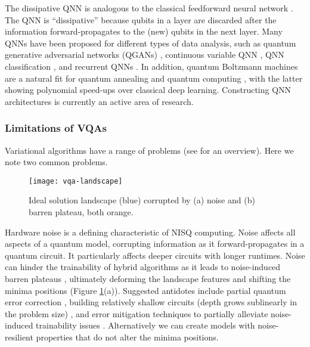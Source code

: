 \documentclass[10pt]{iopart}
\begin{document}
The dissipative QNN is analogous to the classical feedforward neural network \cite{Schuld2014,Beer2020}. The QNN is ``dissipative'' because qubits in a layer are discarded after the information forward-propagates to the (new) qubits in the next layer. Many QNNs have been proposed for different types of data analysis, such as quantum generative adversarial networks (QGANs) \cite{Lloyd2018}, continuous variable QNN \cite{Killoran2019}, QNN classification \cite{Farhi2018}, and recurrent QNNs \cite{Bausch2020}. In addition, quantum Boltzmann machines \cite{Amin2018,Kieferova2017} are a natural fit for quantum annealing \cite{Benedetti2016,Xu2021} and quantum computing \cite{Wiebe2016}, with the latter showing polynomial speed-ups over classical deep learning. Constructing QNN architectures is currently an active area of research. 


\subsubsection{Limitations of VQAs}\hfill

Variational algorithms have a range of problems (see \cite{Cerezo2021,Cerezo2022} for an overview). Here we note two common problems.

\begin{figure}[ht!]
\centering
\texttt{[image: vqa-landscape]}
\caption{Ideal solution landscape (blue) corrupted by (a) noise and (b) barren plateau, both orange.}
\label{fig:vqa-landscape}
\end{figure}

Hardware noise is a defining characteristic of NISQ computing. Noise affects all aspects of a quantum model, corrupting information as it forward-propagates in a quantum circuit. It particularly affects deeper circuits with longer runtimes. Noise can hinder the trainability of hybrid algorithms as it leads to noise-induced barren plateaus \cite{Wang2021n}, ultimately deforming the landscape features and shifting the minima positions (Figure \ref{fig:vqa-landscape}(a)). Suggested antidotes include partial quantum error correction \cite{Bultrini2022}, building relatively shallow circuits (depth grows sublinearly in the problem size) \cite{Wang2021n}, and error mitigation techniques to partially alleviate noise-induced trainability issues \cite{Wang2021m,Endo2021}. Alternatively we can create models with noise-resilient properties \cite{Fontana2021} that do not alter the minima positions.
\end{document}
